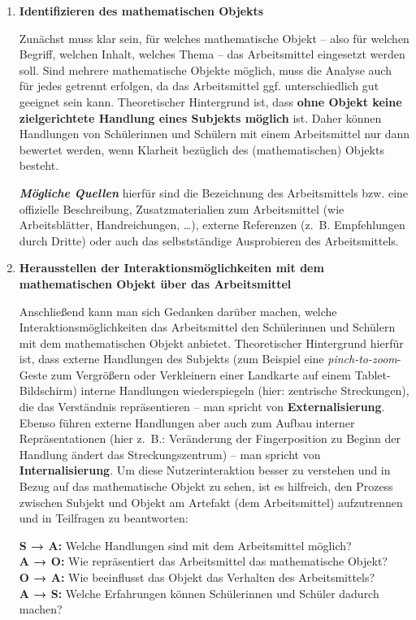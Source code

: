 \documentclass[
]{scrbook}
\theoremstyle{definition}
\theoremstyle{definition}
\theoremstyle{definition}
\theoremstyle{definition}
\theoremstyle{remark}
\begin{document}
\begin{enumerate}
\def\labelenumi{\arabic{enumi}.}
\item
  \textbf{Identifizieren des mathematischen Objekts}

  Zunächst muss klar sein, für welches mathematische Objekt -- also für welchen Begriff, welchen Inhalt, welches Thema -- das Arbeitsmittel eingesetzt werden soll. Sind mehrere mathematische Objekte möglich, muss die Analyse auch für jedes getrennt erfolgen, da das Arbeitsmittel ggf. unterschiedlich gut geeignet sein kann. Theoretischer Hintergrund ist, dass \textbf{ohne Objekt keine zielgerichtete Handlung eines Subjekts möglich} ist. Daher können Handlungen von Schülerinnen und Schülern mit einem Arbeitsmittel nur dann bewertet werden, wenn Klarheit bezüglich des (mathematischen) Objekts besteht.

  \textbf{\emph{Mögliche Quellen}} hierfür sind die Bezeichnung des Arbeitsmittels bzw. eine offizielle Beschreibung, Zusatzmaterialien zum Arbeitsmittel (wie Arbeitsblätter, Handreichungen, \ldots), externe Referenzen (z.~B. Empfehlungen durch Dritte) oder auch das selbstständige Ausprobieren des Arbeitsmittels.
\item
  \textbf{Herausstellen der Interaktionsmöglichkeiten mit dem mathematischen Objekt über das Arbeitsmittel}

  Anschließend kann man sich Gedanken darüber machen, welche Interaktionsmöglichkeiten das Arbeitsmittel den Schülerinnen und Schülern mit dem mathematischen Objekt anbietet. Theoretischer Hintergrund hierfür ist, dass externe Handlungen des Subjekts (zum Beispiel eine \emph{pinch-to-zoom}-Geste zum Vergrößern oder Verkleinern einer Landkarte auf einem Tablet-Bildschirm) interne Handlungen wiederspiegeln (hier: zentrische Streckungen), die das Verständnis repräsentieren -- man spricht von \textbf{Externalisierung}. Ebenso führen externe Handlungen aber auch zum Aufbau interner Repräsentationen (hier z.~B.: Veränderung der Fingerposition zu Beginn der Handlung ändert das Streckungszentrum) -- man spricht von \textbf{Internalisierung}. Um diese Nutzerinteraktion besser zu verstehen und in Bezug auf das mathematische Objekt zu sehen, ist es hilfreich, den Prozess zwischen Subjekt und Objekt am Artefakt (dem Arbeitsmittel) aufzutrennen und in Teilfragen zu beantworten:

  \textbf{S → A:} Welche Handlungen sind mit dem Arbeitsmittel möglich?\\
  \textbf{A → O:} Wie repräsentiert das Arbeitsmittel das mathematische Objekt?\\
  \textbf{O → A:} Wie beeinflusst das Objekt das Verhalten des Arbeitsmittels?\\
  \textbf{A → S:} Welche Erfahrungen können Schülerinnen und Schüler dadurch machen?


\end{enumerate}
\end{document}
